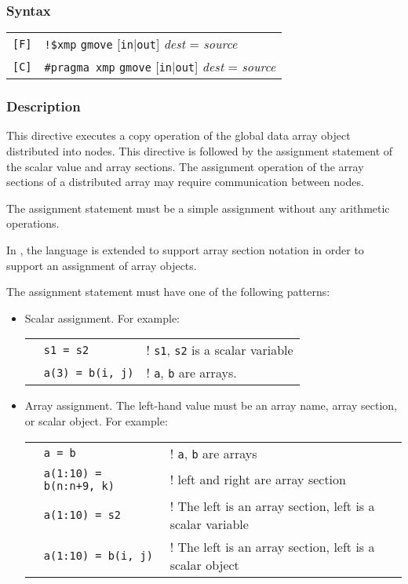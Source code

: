 \subsubsection*{Syntax}

\begin{tabular}{ll}
\verb![F]! & \verb|!$xmp| {\tt gmove} [{\tt in}$\vert${\tt out}] {\it dest}
= {\it source} \\
\verb![C]! & \verb|#pragma xmp| {\tt gmove} [{\tt in}$\vert${\tt out}] {\it
  dest} = {\it source} \\
\end{tabular}

\subsubsection*{Description}

This directive executes a copy operation of the global data array object
distributed into nodes. This directive is followed by the assignment
statement of the scalar value and array sections. The assignment operation
of the array sections of a distributed array may require communication
between nodes.

The assignment statement must be a simple assignment without
any arithmetic operations.   

In {\XMP}, the {\C} language is extended to support array section notation in order to
support an assignment of array objects.

The assignment statement must have one of the following patterns:

\begin{itemize}
\item  Scalar assignment. For example:

\begin{tabular}{lll}
\hspace{0.5cm} & {\tt s1 = s2} & ! {\tt s1}, {\tt s2} is a scalar
variable \\ 
& {\tt a(3) = b(i, j)} & ! {\tt a}, {\tt b} are arrays. \\
\end{tabular}

\item Array assignment. The left-hand value must be an array name,
array section, or scalar object. For example:

\begin{tabular}{lll}
\hspace{0.5cm} & {\tt a = b} & ! {\tt a}, {\tt b} are arrays \\
 & {\tt a(1:10) = b(n:n+9, k)} & ! left and right are array section \\
 & {\tt a(1:10) = s2} & ! The left is an array section, left is a
 scalar variable \\
 & {\tt a(1:10) = b(i, j)} & ! The left is an array section, left is a
 scalar object \\
\end{tabular}
\end{itemize}

